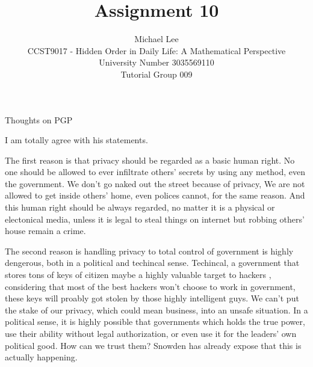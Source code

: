 \documentclass[12pt]{article}
\newenvironment{question}[2][Question]{\begin{trivlist}
    \item[\hskip \labelsep {\bfseries #1}\hskip \labelsep {\bfseries #2.}]}{\end{trivlist}}
\newenvironment{answer}[2][Answer]{\begin{trivlist}
    \item[\hskip \labelsep {\bfseries #1}\hskip \labelsep {\bfseries #2.}]}{\end{trivlist}}
\begin{document}


\title{Assignment 10}%
\author{Michael Lee\\ %
	CCST9017 - Hidden Order in Daily Life: A Mathematical Perspective \\
	University Number 3035569110 \\
	Tutorial Group 009
} %


\maketitle

\begin{question}{Q. 1}
	Thoughts on PGP
\end{question}
\begin{answer}{Q. 1}
    \hfill \par
    I am totally agree with his statements. \par
    The first reason is that privacy should be regarded as a basic human right.
    No one should be allowed to ever infiltrate others' secrets by using any method,
    even the government. We don't go naked out the street because of privacy,
    We are not allowed to get inside others' home, even polices cannot, 
    for the same reason. And this human right should be always regarded, no matter it
    is a physical or electonical media, unless it is legal to steal things
    on internet but robbing others' house remain a crime. \par
    The second reason is handling privacy to total control of government is 
    highly dengerous, both in a political and techincal sense. Techincal, a government
    that stores tons of keys of citizen maybe a highly valuable target to hackers
    , considering that most of the best hackers won't choose to work in government,
    these keys will proably got stolen by those highly intelligent guys.
    We can't put the stake of our privacy, which could mean business, into 
    an unsafe situation. In a political sense, it is highly possible that governments
    which holds the true power, use their ability without legal authorization,
    or even use it for the leaders' own political good. How can we trust them?
    Snowden has already expose that this is actually happening.
\end{answer}
\end{document}
